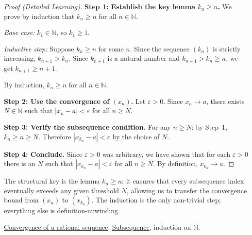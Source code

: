 \begin{proof}[Proof (Detailed Learning)]
\textbf{Step 1: Establish the key lemma $k_n \geq n$.}
We prove by induction that $k_n \geq n$ for all $n \in \mathbb{N}$.

\emph{Base case:} $k_1 \in \mathbb{N}$, so $k_1 \geq 1$.

\emph{Inductive step:} Suppose $k_n \geq n$ for some $n$.
Since the sequence $(k_n)$ is strictly increasing, $k_{n+1} > k_n$.
Since $k_{n+1}$ is a natural number and $k_{n+1} > k_n \geq n$,
we get $k_{n+1} \geq n + 1$.

By induction, $k_n \geq n$ for all $n \in \mathbb{N}$.

\textbf{Step 2: Use the convergence of $(x_n)$.}
Let $\varepsilon > 0$.  Since $x_n \to a$, there exists $N \in \mathbb{N}$
such that $|x_n - a| < \varepsilon$ for all $n \geq N$.

\textbf{Step 3: Verify the subsequence condition.}
For any $n \geq N$: by Step~1, $k_n \geq n \geq N$.
Therefore $|x_{k_n} - a| < \varepsilon$ by the choice of $N$.

\textbf{Step 4: Conclude.}
Since $\varepsilon > 0$ was arbitrary, we have shown that for each
$\varepsilon > 0$ there is an $N$ such that $|x_{k_n} - a| < \varepsilon$
for all $n \geq N$.  By definition, $x_{k_n} \to a$.
\end{proof}

\begin{remark*}
The structural key is the lemma $k_n \geq n$: it ensures that every
subsequence index eventually exceeds any given threshold $N$, allowing
us to transfer the convergence bound from $(x_n)$ to $(x_{k_n})$.
The induction is the only non-trivial step; everything else is definition-unwinding.
\end{remark*}

\begin{dependencies}
\hyperref[def:convergent-rational-sequence]{Convergence of a rational sequence},
\hyperref[def:subsequence-q]{Subsequence},
induction on $\mathbb{N}$.
\end{dependencies}
